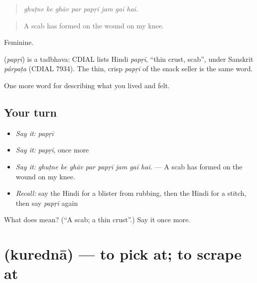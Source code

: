 \begin{quote}
       
\end{quote}

\begin{quote}
\emph{ghuṭne ke ghāv par papṛī jam gaī hai.}
\end{quote}

\begin{quote}
A scab has formed on the wound on my knee.
\end{quote}

Feminine.

\begin{cousinweb}
\textbf{} (\emph{papṛī}) is a tadbhava: CDIAL lists Hindi \emph{papṛī}, \textquotedblleft{}thin crust, scab\textquotedblright{}, under Sanskrit \emph{párpaṭa} (CDIAL 7934). The thin, crisp \emph{papṛī} of the snack seller is the same word.
\end{cousinweb}

\begin{grammarlens}[title={What you've built}]
One more word for describing what you lived and felt.
\end{grammarlens}

\subsection*{Your turn}
\begin{itemize}
\raggedright
  \item \emph{Say it:} \emph{papṛī}
  \item \emph{Say it:} \emph{papṛī}, once more
  \item \emph{Say it:} \emph{ghuṭne ke ghāv par papṛī jam gaī hai.} — A scab has formed on the wound on my knee.
  \item \emph{Recall:} say the Hindi for a blister from rubbing, then the Hindi for a stitch, then say \emph{papṛī} again
\end{itemize}

\begin{tcolorbox}[breakable,colback=teal!4,colframe=teal!35!black,title={Before you move on}]
What does  mean? (\textquotedblleft{}A scab; a thin crust\textquotedblright{}.) Say it once more.
\end{tcolorbox}
\section[\texorpdfstring{\hi{कुरेदना} (kurednā)}{कुरेदना (kurednā)}]{ (kurednā) — to pick at; to scrape at}

